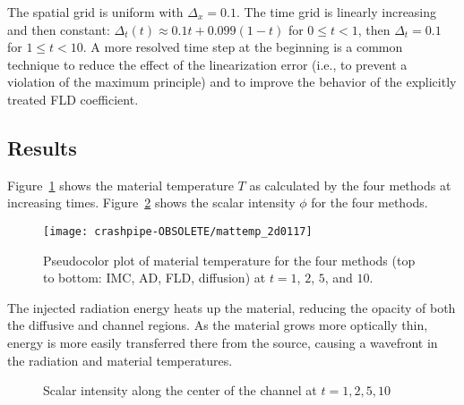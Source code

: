 \documentclass[11pt,letter,twoside]{mc2011}
\begin{document}
The spatial grid is uniform with $\Delta_x=0.1$. The time grid is linearly
increasing and then constant: $\Delta_t(t)\approx 0.1 t + 0.099 (1 - t)$ for $0
\le t < 1$, then $\Delta_t=0.1$ for $1 \le t < 10$. A more resolved time step at
the beginning is a common technique to reduce the effect of the linearization
error (i.e., to prevent a violation of the maximum principle) and to improve
the behavior of the explicitly treated FLD coefficient.

\subsection{Results}
Figure~\ref{fig:mattemp2d} shows the material temperature $T$ as calculated
by the four methods at increasing times. Figure~\ref{fig:phi}
shows the scalar intensity $\phi$ for the four methods.
%
\begin{figure}[htb]
  \centering
  \texttt{[image: crashpipe-OBSOLETE/mattemp\_2d0117]}
  \caption{Pseudocolor plot of material temperature for the four methods (top
  to bottom: IMC, AD, FLD, diffusion) at $t=1$, $2$, $5$, and $10$.}
  \label{fig:mattemp2d}
\end{figure}
%
The injected radiation energy heats up the material, reducing the opacity of
both the diffusive and channel regions. As the material grows more optically
thin, energy is more easily transferred there from the source, causing a
wavefront in the radiation and material temperatures.

\begin{figure}[htb]
  \centering
  \hspace{-1.25in}
  \subfloat[$t=1.0$]{
  \small}
  \hspace{-.4in}
  \subfloat[$t=2.0$]{
  \small}
  \hspace{-1.25in}

  \hspace{-1.25in}
  \subfloat[$t=5.0$]{
  \small}
  \hspace{-.4in}
  \subfloat[$t=10.0$]{
  \small}
  \hspace{-1.25in}
  \caption{Scalar intensity along the center of the channel at $t=1,2,5,10$}
  \label{fig:phi}
\end{figure}
\end{document}
